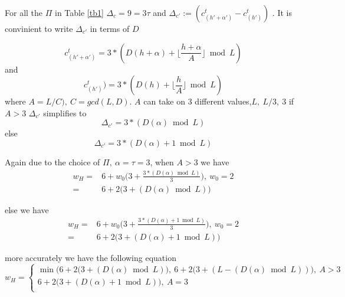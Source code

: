 \documentclass[11pt, oneside, dvipdfmx]{book}
\begin{document}
For all the $\Pi$ in Table \ref{tb1} $\Delta_c = 9=3\tau$ and $\Delta_{c'}:=(c_{(h'+\alpha')}^{t}-c_{(h')}^{t})$ . It is convinient to write $\Delta_{c'}$ in terms of $D$ 

$$c_{(h'+\alpha')}^{t}=3*(D(h+\alpha)+ \lfloor \frac{h+\alpha}{A} \rfloor \bmod L)$$ and $$c_{(h')}^{t})=3*(D(h)+ \lfloor \frac{h}{A} \rfloor \bmod L)$$
where $A=L/C),~C=gcd(L,D)$. 
$A$ can take on $3$ different values,$L,~L/3,~3$
if $A>3$ $\Delta_{c'}$ simplifies to $$\Delta_{c'}=3*(D(\alpha) \bmod L)$$ else $$\Delta_{c'}=3*(D(\alpha) +1\bmod L)$$ 

Again due to the choice of $\Pi,~\alpha=\tau=3$, when $A>3$ we have 
\begin{equation*}
\begin{split}
w_H=&6+w_0\Big(3+\frac{3*(D(\alpha) \bmod L)}{3}\Big),~w_0=2\\
=&6+2\Big(3+(D(\alpha) \bmod L)\Big)
\end{split}
\end{equation*}

else we have 
\begin{equation*}
\begin{split}
w_H=&6+w_0\Big(3+\frac{3*(D(\alpha) +1 \bmod L)}{3}\Big),~w_0=2\\
=&6+2\Big(3+(D(\alpha)+1 \bmod L)\Big)
\end{split}
\end{equation*}

more accurately we have the following equation
\begin{equation}
w_H=
\begin{cases}
\min (6+2\Big(3+(D(\alpha) \bmod L)\Big),~6+2\Big(3+(L-(D(\alpha) \bmod L))\Big), ~A>3 \\
6+2\Big(3+(D(\alpha)+1 \bmod L)\Big), ~A=3\\

\end{cases}
\label{eq9}
\end{equation}


\end{document}
